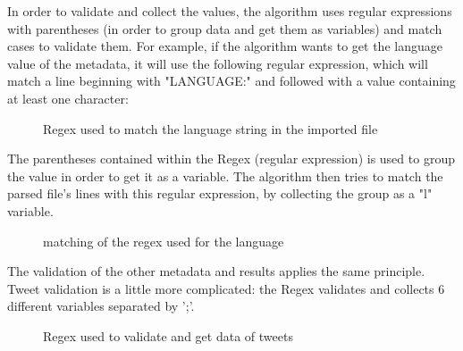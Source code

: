 \documentclass[a4paper,11pt]{report}
\begin{document}
In order to validate and collect the values, the algorithm uses regular expressions with parentheses (in order to group data and get them as variables) and match cases to validate them. For example, if the algorithm wants to get the language value of the metadata, it will use the following regular expression, which will match a line beginning with "LANGUAGE:" and followed with a value containing at least one character:
\begin{figure}[H]
\vspace{-5pt}
\begin{center}
\vspace{-5pt}
\caption{Regex used to match the language string in the imported file}
\end{center}
\end{figure}
\newpage

The parentheses contained within the Regex (regular expression) is used to group the value in order to get it as a variable. The algorithm then tries to match the parsed file's lines with this regular expression, by collecting the group as a "l" variable.
\begin{figure}[H]
\vspace{-5pt}
\begin{center}
\vspace{-5pt}
\caption{matching of the regex used for the language}
\end{center}
\end{figure}

The validation of the other metadata and results applies the same principle. Tweet validation is a little more complicated: the Regex validates and collects 6 different variables separated by ';'.
\begin{figure}[H]
\vspace{-5pt}
\begin{center}
\vspace{-20pt}
\caption{Regex used to validate and get data of tweets}
\end{center}
\end{figure}
\end{document}
